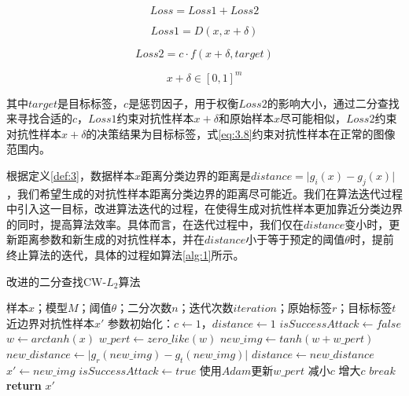 \begin{equation}
	\label{eq:3.5}
	Loss = Loss1 + Loss2 
\end{equation}

\begin{equation}
	\label{eq:3.6}
	Loss1 = D(x, x + \delta)
\end{equation}

\begin{equation}
	\label{eq:3.7}
	Loss2 = c \cdot f(x + \delta,target)
\end{equation}

\begin{equation}
	\label{eq:3.8}
	x + \delta \in [0,1]^m
\end{equation}

\noindent 其中$target$是目标标签，$c$是惩罚因子，用于权衡$Loss2$的影响大小，通过二分查找来寻找合适的$c$，$Loss1$约束对抗性样本$x + \delta$和原始样本$x$尽可能相似，$Loss2$约束对抗性样本$x + \delta$的决策结果为目标标签，式\ref{eq:3.8}约束对抗性样本在正常的图像范围内。

根据定义\ref{def:3}，数据样本$x$距离分类边界的距离是$distance = \vert g_i(x) - g_j(x) \vert$，我们希望生成的对抗性样本距离分类边界的距离尽可能近。我们在算法迭代过程中引入这一目标，改进算法迭代的过程，在使得生成对抗性样本更加靠近分类边界的同时，提高算法效率。具体而言，在迭代过程中，我们仅在$distance$变小时，更新距离参数和新生成的对抗性样本，并在$distance$小于等于预定的阈值$\theta$时，提前终止算法的迭代，具体的过程如算法\ref{alg:1}所示。

\begin{algorithm}[H] 
	\caption{改进的二分查找CW-$L_2$算法}
	\label{alg:1}
	\begin{algorithmic}[1]
		
		\Require 样本$x$；模型$M$；阈值$\theta$；二分次数$n$；迭代次数$iteration$；原始标签$r$；目标标签$t$
		\Ensure 近边界对抗性样本$x'$
		\State 参数初始化：$c\gets1$，$distance \gets 1$
			\State $isSuccessAttack \gets false$
			\State $w \gets arctanh(x)$
			\State $w\_pert \gets zero\_like(w)$
				\State $new\_img \gets tanh(w + w\_pert)$
				\State $new\_distance \gets \vert g_r(new\_img) - g_t(new\_img) \vert$
					\State $distance \gets new\_distance$
					\State $x' \gets new\_img$
					\State $isSuccessAttack \gets true$
				\EndIf
				\State 使用$Adam$更新$w\_pert$
			\EndFor
			\State 减小$c$
			\Else \State 增大$c$
			\EndIf 
			\State $break$
			\EndIf
		\EndFor
		\State \textbf{return} $x'$
	\end{algorithmic}
\end{algorithm}


